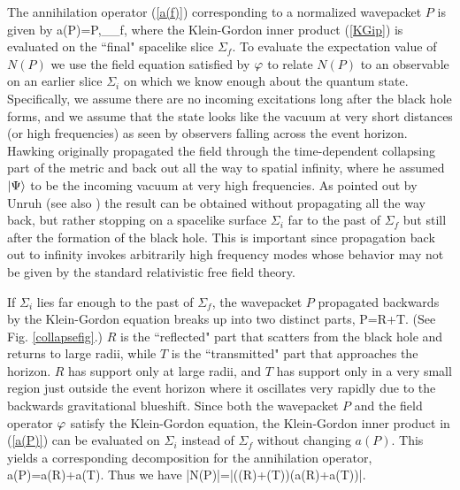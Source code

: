 \documentclass[12pt]{article}
\begin{document}
The annihilation operator (\ref{a(f)}) corresponding to a normalized
wavepacket $P$ is given by 
\beq
a(P)=\la P,\fphi\ra_{\Sigma_f},
\label{a(P)}
\eeq
where the
Klein-Gordon inner product (\ref{KGip}) is evaluated on the
``final" spacelike slice $\Sigma_f$. To evaluate the 
expectation value of $N(P)$ we use the field equation satisfied
by $\varphi$ to relate $N(P)$ to an observable on an 
earlier slice $\Sigma_i$ on which we know enough
about the quantum state.
Specifically, we assume there are no incoming 
excitations long after the black hole forms, and 
we assume that the state looks like the vacuum at 
very short distances (or high frequencies) 
as seen by observers falling across the event horizon. 
Hawking originally propagated the field through the
time-dependent collapsing  part of the metric and back out all the 
way to spatial infinity, where he assumed 
$|\Psi\rangle$ to be the incoming 
vacuum at very high frequencies.  As pointed out by 
Unruh\cite{Unruh:ga} 
(see also \cite{Fredenhagen:1989kr,Jacobson:1993hn})
the result can be obtained without propagating
all the way back, but rather stopping on a spacelike
surface $\Sigma_i$ far to the past of $\Sigma_f$ 
but still after the formation of the black hole.
This is important since propagation back out to infinity
invokes arbitrarily high frequency modes whose 
behavior may not be given by the standard relativistic free
field theory.

If $\Sigma_i$ lies
far enough to the past of $\Sigma_f$,
the wavepacket $P$ propagated backwards
by the Klein-Gordon equation
breaks up into two distinct parts,
\beq
P=R+T.
\eeq
(See Fig. \ref{collapsefig}.)
$R$ is the ``reflected" part that scatters
from the black hole and returns to large radii, while 
$T$ is the ``transmitted" part that approaches 
the horizon. 
$R$ has support only at large radii, and $T$ has support
only in a very small region just outside the event horizon
where it oscillates very rapidly due to the backwards
gravitational blueshift.
Since both the wavepacket $P$ and the field operator $\varphi$ 
satisfy the Klein-Gordon equation, the Klein-Gordon inner 
product in (\ref{a(P)}) can be evaluated on $\Sigma_i$
instead of $\Sigma_f$ without changing 
$a(P)$. This yields
a corresponding decomposition for the annihilation
operator, 
\beq
a(P)=a(R)+a(T).
\eeq
Thus we have 
\beq
\la\Psi|N(P)|\Psi\ra=\la\Psi|(\ad(R)+\ad(T))(a(R)+a(T))|\Psi\ra.
\label{NRT}
\eeq
\end{document}

